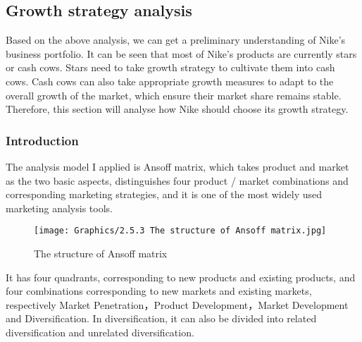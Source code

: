 \documentclass[a4paper, 12pt]{report}
\begin{document}
\subsection{Growth strategy analysis}
Based on the above analysis, we can get a preliminary understanding of Nike's business portfolio. It can be seen that most of Nike's products are currently stars or cash cows. Stars need to take growth strategy to cultivate them into cash cows. Cash cows can also take appropriate growth measures to adapt to the overall growth of the market, which ensure their market share remains stable. Therefore, this section will analyse how Nike should choose its growth strategy.
\subsubsection{Introduction}
The analysis model I applied is Ansoff matrix, which takes product and market as the two basic aspects, distinguishes four product / market combinations and corresponding marketing strategies, and it is one of the most widely used marketing analysis tools.\par
\begin{figure}[ht]
 			\begin{center}
				\texttt{[image: Graphics/2.5.3 The structure of Ansoff matrix.jpg]}
			\end{center}
       		\caption{\label{2.5.3.1}The structure of Ansoff matrix}
 \end{figure}
It has four quadrants, corresponding to new products and existing products, and four combinations corresponding to new markets and existing markets, respectively Market Penetration，Product Development，Market Development and Diversification. In diversification, it can also be divided into related diversification and unrelated diversification.
\end{document}
